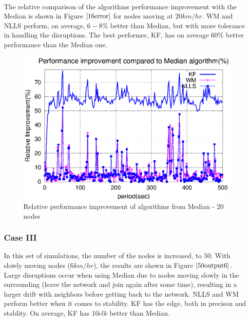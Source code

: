 \documentclass[a4paper,10pt]{report}
\begin{document}
\paragraph*{}
The relative comparison of the algorithms performance improvement with the Median is shown in Figure $\ref{16error}$ for nodes moving at $20km/hr$. WM and NLLS perform, on average, $6-8\%$ better than Median, but with more tolerance in handling the disruptions. The best performer, KF, has on average $60\%$ better performance than the Median one.
\begin{figure}
\centering
\includegraphics[width= 0.7 \textwidth]{16output-error}
\caption{Relative performance improvement of algorithms from Median - 20 nodes} \label{16error}
\end{figure}
\subsubsection{\textbf{Case III}}
In this set of simulations, the number of the nodes is increased, to $50$. With slowly moving nodes ($6km/hr$), the results are shown in Figure $\ref{50output6}$. Large disruptions occur when using Median due to nodes moving slowly in the surrounding (leave the network and join again after some time), resulting in a larger drift with neighbors before getting back to the network. NLLS and WM perform better when it comes to stability. KF has the edge, both in precison and stablity. On average, KF has $10clk$ better than Median.
\end{document}
